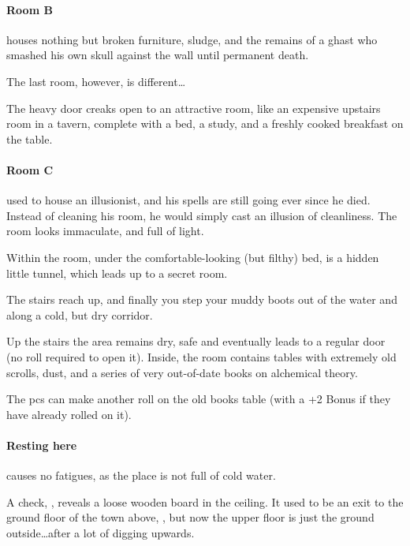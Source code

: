 \paragraph{Room B} houses nothing but broken furniture, sludge, and the remains of a ghast who smashed his own skull against the wall until permanent death.

The last room, however, is different\ldots

\begin{boxtext}
  The heavy door creaks open to an attractive room, like an expensive upstairs room in a tavern, complete with a bed, a study, and a freshly cooked breakfast on the table.
\end{boxtext}
\paragraph{Room C} used to house an illusionist, and his spells are still going ever since he died.
Instead of cleaning his room, he would simply cast an illusion of cleanliness.
The room looks immaculate, and full of light.

Within the room, under the comfortable-looking (but filthy) bed, is a hidden little tunnel, which leads up to a secret room.

\begin{boxtext}
  The stairs reach up, and finally you step your muddy boots out of the water and along a cold, but dry corridor.
\end{boxtext}


Up the stairs the area remains dry, safe and eventually leads to a regular door (no roll required to open it).
Inside, the room contains tables with extremely old scrolls, dust, and a series of very out-of-date books on alchemical theory.

The \glspl{pc} can make another roll on the old books table  (with a +2 Bonus if they have already rolled on it).

\paragraph{Resting here}
causes no \glspl{fatigue}, as the place is not full of cold water.

A  check, \tn[10], reveals a loose wooden board in the ceiling.
It used to be an exit to the ground floor of the town above, , but now the upper floor is just the ground outside\ldots after a lot of digging upwards.

